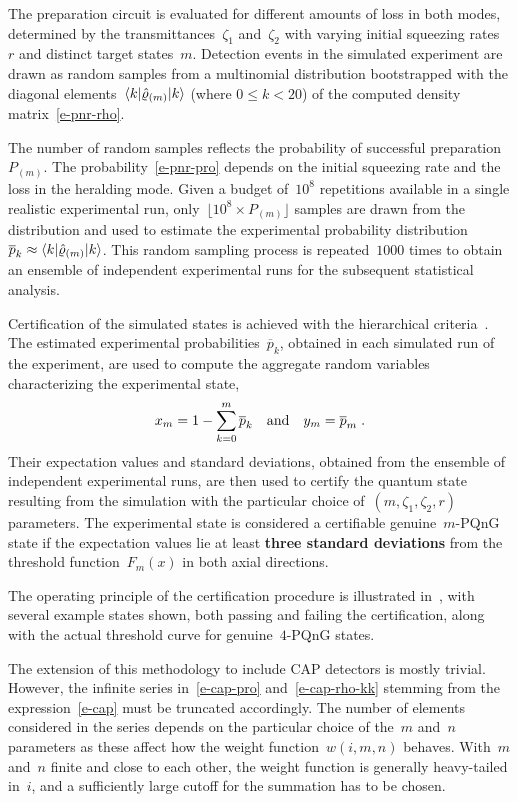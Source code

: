 \documentclass{article}
\begin{document}
The preparation circuit is evaluated for different amounts of loss in both modes, determined by the transmittances~$\zeta_{1}$ and~$\zeta_{2}$ with varying initial squeezing rates~$r$ and distinct target states~${m}$. Detection events in the simulated experiment are drawn as random samples from a multinomial distribution bootstrapped with the diagonal elements~$\braket{k|\hat{\varrho}_{(m)}|k}$ (where ${0 \leq k < 20}$) of the computed density matrix~\eqref{e-pnr-rho}. 

The number of random samples reflects the probability of successful preparation $P_{(m)}$. The probability~\eqref{e-pnr-pro} depends on the initial squeezing rate and the loss in the heralding mode. Given a budget of~$10^{8}$ repetitions available in a single realistic experimental run, only~${\lfloor 10^{8} \times P_{(m)} \rfloor}$ samples are drawn from the distribution and used to estimate the experimental probability distribution~${\overline{p}_{k} \approx \braket{k|\hat{\varrho}_{(m)}|k}}$. This random sampling process is repeated~$1000$ times to obtain an ensemble of independent experimental runs for the subsequent statistical analysis.

Certification of the simulated states is achieved with the hierarchical criteria~\cite{lachman2019}. The estimated experimental probabilities~$\overline{p}_{k}$, obtained in each simulated run of the experiment, are used to compute the aggregate random variables characterizing the experimental state,
%
\begin{equation}
  x_{m} = 1 - \sum_{k = 0}^{m} \overline{p}_{k} 
  \quad\text{and}\quad
  y_{m} = \overline{p}_{m} 
  \;\text{.}
\end{equation}
%
Their expectation values and standard deviations, obtained from the ensemble of independent experimental runs, are then used to certify the quantum state resulting from the simulation with the particular choice of~${(m, \zeta_{1}, \zeta_{2}, r)}$ parameters. The experimental state is considered a certifiable genuine~$m$-PQnG state if the expectation values lie at least \textbf{three standard deviations} from the threshold function~$F_{m} (x)$ in both axial directions.

The operating principle of the certification procedure is illustrated in~, with several example states shown, both passing and failing the certification, along with the actual threshold curve for genuine~$4$-PQnG states.

The extension of this methodology to include CAP detectors is mostly trivial. However, the infinite series in~\eqref{e-cap-pro} and~\eqref{e-cap-rho-kk} stemming from the expression~\eqref{e-cap} must be truncated accordingly. The number of elements considered in the series depends on the particular choice of the~$m$ and~$n$ parameters as these affect how the weight function~${w(i, m, n)}$ behaves. With~$m$ and~$n$ finite and close to each other, the weight function is generally heavy-tailed in~$i$, and a sufficiently large cutoff for the summation has to be chosen.
\end{document}
